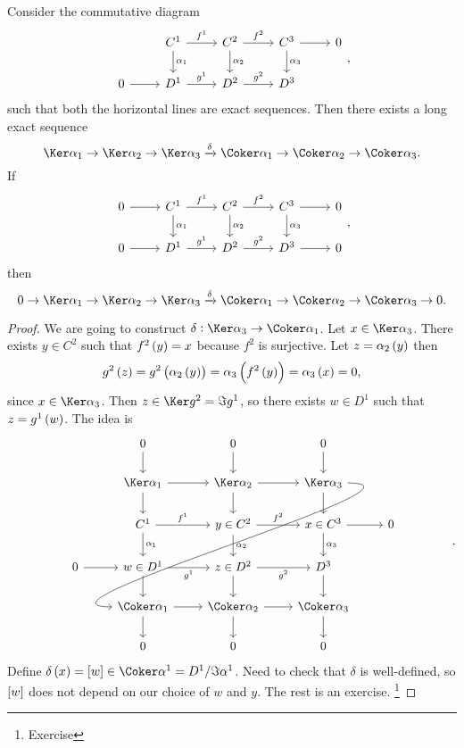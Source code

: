 \begin{lemma}
Consider the commutative diagram
$$
\begin{tikzcd}
& C^1 \arrow{r}{f^1} \arrow{d}{\alpha_1} & C^2 \arrow{r}{f^2} \arrow{d}{\alpha_2} & C^3 \arrow{r} \arrow{d}{\alpha_3} & 0 \\
0 \arrow{r} & D^1 \arrow{r}{g^1} & D^2 \arrow{r}{g^2} & D^3 &
\end{tikzcd},
$$
such that both the horizontal lines are exact sequences. Then there exists a long exact sequence
$$ \Ker \alpha_1 \to \Ker \alpha_2 \to \Ker \alpha_3 \xrightarrow{\delta} \Coker \alpha_1 \to \Coker \alpha_2 \to \Coker \alpha_3. $$
If
$$
\begin{tikzcd}
0 \arrow{r} & C^1 \arrow{r}{f^1} \arrow{d}{\alpha_1} & C^2 \arrow{r}{f^2} \arrow{d}{\alpha_2} & C^3 \arrow{r} \arrow{d}{\alpha_3} & 0 \\
0 \arrow{r} & D^1 \arrow{r}{g^1} & D^2 \arrow{r}{g^2} & D^3 \arrow{r} & 0
\end{tikzcd},
$$
then
$$ 0 \to \Ker \alpha_1 \to \Ker \alpha_2 \to \Ker \alpha_3 \xrightarrow{\delta} \Coker \alpha_1 \to \Coker \alpha_2 \to \Coker \alpha_3 \to 0. $$
\end{lemma}

\begin{proof}
We are going to construct $ \delta : \Ker \alpha_3 \to \Coker \alpha_1 $. Let $ x \in \Ker \alpha_3 $. There exists $ y \in C^2 $ such that $ f^2\br{y} = x $ because $ f^2 $ is surjective. Let $ z = \alpha_2\br{y} $ then
$$ g^2\br{z} = g^2\br{\alpha_2\br{y}} = \alpha_3\br{f^2\br{y}} = \alpha_3\br{x} = 0, $$
since $ x \in \Ker \alpha_3 $. Then $ z \in \Ker g^2 = \Im g^1 $, so there exists $ w \in D^1 $ such that $ z = g^1\br{w} $. The idea is
$$
\begin{tikzcd}
& 0 \arrow{d} & 0 \arrow{d} & 0 \arrow{d} & \\
& \Ker \alpha_1 \arrow{r} \arrow{d} & \Ker \alpha_2 \arrow{r} \arrow{d} & \Ker \alpha_3 \arrow{d} \arrow[in=180, out=0]{dddll} & \\
& C^1 \arrow{r}{f^1} \arrow{d}{\alpha_1} & y \in C^2 \arrow{r}{f^2} \arrow{d}{\alpha_2} & x \in C^3 \arrow{r} \arrow{d}{\alpha_3} & 0 \\
0 \arrow{r} & w \in D^1 \arrow[swap]{r}{g^1} \arrow{d} & z \in D^2 \arrow[swap]{r}{g^2} \arrow{d} & D^3 \arrow{d} &\\
& \Coker \alpha_1 \arrow{r} \arrow{d} & \Coker \alpha_2 \arrow{r} \arrow{d} & \Coker \alpha_3 \arrow{d} & \\
& 0 & 0 & 0 &
\end{tikzcd}.
$$
Define $ \delta\br{x} = \sbr{w} \in \Coker \alpha^1 = D^1 / \Im \alpha^1 $. Need to check that $ \delta $ is well-defined, so $ \sbr{w} $ does not depend on our choice of $ w $ and $ y $. The rest is an exercise. \footnote{Exercise}
\end{proof}

